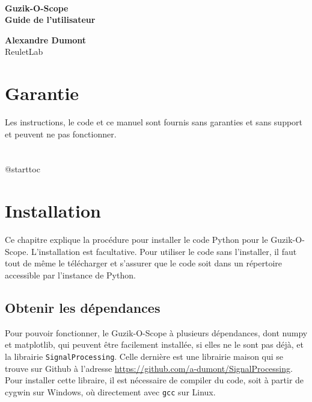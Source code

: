 \documentclass[openright,letterpaper,12pt]{book}
\begin{document}

\clearpage\null\thispagestyle{empty}\clearpage
\thispagestyle{empty}
{\ } 

\vspace{3cm}
\noindent
{\fontsize{35.83pt}{40pt}\selectfont\bf Guzik-O-Scope\\} 
{\Large\bf Guide de l'utilisateur}

\vspace{10cm}\noindent
{\huge\bf Alexandre Dumont}\\
{\large ReuletLab}

\clearpage\null\thispagestyle{empty}

\renewcommand{\tableofcontents}
             {
                \clearpage
                \chapter*{\pdfbookmark[chapter]{\contentsname}{toc}
                          \contentsname}
                \csname @starttoc\endcsname{toc}
             }
\frontmatter
\chapter*{Garantie}
Les instructions, le code et ce manuel sont fournis sans garanties et sans 
support et peuvent ne pas fonctionner.
\clearpage\null\thispagestyle{empty}

\tableofcontents
\clearpage\null\thispagestyle{empty}

\mainmatter

\clearpage
\chapter*{Installation}
Ce chapitre explique la procédure pour installer le code Python pour le 
Guzik-O-Scope. 
L'installation est facultative. 
Pour utiliser le code sans l'installer, il faut tout de même le télécharger et 
s'assurer que le code soit dans un répertoire accessible par l'instance de 
Python.

\section*{Obtenir les dépendances}
Pour pouvoir fonctionner, le Guzik-O-Scope à plusieurs dépendances, dont numpy 
et matplotlib, qui peuvent être facilement installée, si elles ne le sont pas 
déjà, et la librairie \verb+SignalProcessing+. 
Celle dernière est une librairie maison qui se trouve sur Github à l'adresse 
\href{https://github.com/a-dumont/SignalProcessing}
{https://github.com/a-dumont/SignalProcessing}. 
Pour installer cette libraire, il est nécessaire de compiler du code, soit à 
partir de cygwin sur Windows, où directement avec \verb+gcc+ sur Linux.
\end{document}
